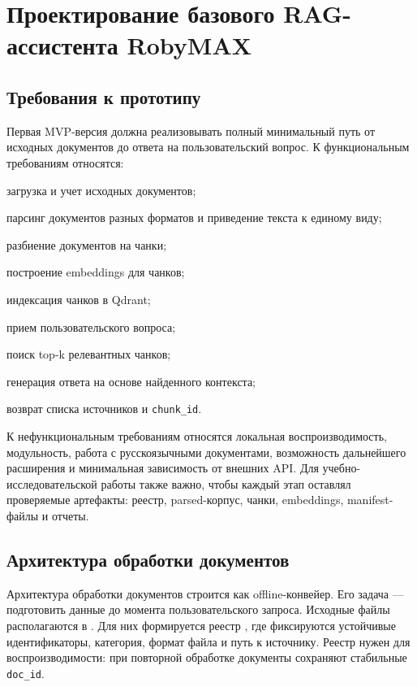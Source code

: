 \chapter{Проектирование базового RAG-ассистента RobyMAX}
\label{chapter:architecture}

\section{Требования к прототипу}

Первая MVP-версия должна реализовывать полный минимальный путь от исходных документов до ответа на пользовательский вопрос. К функциональным требованиям относятся:
\begin{compactenum}
  \item загрузка и учет исходных документов;
  \item парсинг документов разных форматов и приведение текста к единому виду;
  \item разбиение документов на чанки;
  \item построение embeddings для чанков;
  \item индексация чанков в Qdrant;
  \item прием пользовательского вопроса;
  \item поиск top-k релевантных чанков;
  \item генерация ответа на основе найденного контекста;
  \item возврат списка источников и \texttt{chunk\_id}.
\end{compactenum}

К нефункциональным требованиям относятся локальная воспроизводимость, модульность, работа с русскоязычными документами, возможность дальнейшего расширения и минимальная зависимость от внешних API. Для учебно-исследовательской работы также важно, чтобы каждый этап оставлял проверяемые артефакты: реестр, parsed-корпус, чанки, embeddings, manifest-файлы и отчеты.

\section{Архитектура обработки документов}

Архитектура обработки документов строится как offline-конвейер. Его задача — подготовить данные до момента пользовательского запроса. Исходные файлы располагаются в . Для них формируется реестр , где фиксируются устойчивые идентификаторы, категория, формат файла и путь к источнику. Реестр нужен для воспроизводимости: при повторной обработке документы сохраняют стабильные \texttt{doc\_id}.

